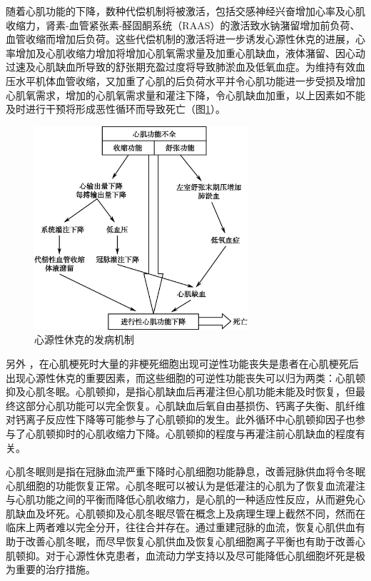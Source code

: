 随着心肌功能的下降，数种代偿机制将被激活，包括交感神经兴奋增加心率及心肌收缩力，肾素-血管紧张素-醛固酮系统（RAAS）的激活致水钠潴留增加前负荷、血管收缩而增加后负荷。这些代偿机制的激活将进一步诱发心源性休克的进展，心率增加及心肌收缩力增加将增加心肌氧需求量及加重心肌缺血，液体潴留、因心动过速及心肌缺血所导致的舒张期充盈过度将导致肺淤血及低氧血症。为维持有效血压水平机体血管收缩，又加重了心肌的后负荷水平并令心肌功能进一步受损及增加心肌氧需求，增加的心肌氧需求量和灌注下降，令心肌缺血加重，以上因素如不能及时进行干预将形成恶性循环而导致死亡（图\ref{fig21-1}）。

\begin{figure}[!htbp]
 \centering
 \includegraphics[width=3.11458in,height=2.96875in]{./images/Image00088.jpg}
 \captionsetup{justification=centering}
 \caption{心源性休克的发病机制}
 \label{fig21-1}
  \end{figure} 

另外
，在心肌梗死时大量的非梗死细胞出现可逆性功能丧失是患者在心肌梗死后出现心源性休克的重要因素，而这些细胞的可逆性功能丧失可以归为两类：心肌顿抑及心肌冬眠。心肌顿抑，是指心肌缺血后再灌注但心肌功能未能及时恢复，但最终这部分心肌功能可以完全恢复。心肌缺血后氧自由基损伤、钙离子失衡、肌纤维对钙离子反应性下降等可能参与了心肌顿抑的发生。此外循环中心肌顿抑因子也参与了心肌顿抑时的心肌收缩力下降。心肌顿抑的程度与再灌注前心肌缺血的程度有关。

心肌冬眠则是指在冠脉血流严重下降时心肌细胞功能静息，改善冠脉供血将令冬眠心肌细胞的功能恢复正常。心肌冬眠可以被认为是低灌注的心肌为了恢复血流灌注与心肌功能之间的平衡而降低心肌收缩力，是心肌的一种适应性反应，从而避免心肌缺血及坏死。心肌顿抑及心肌冬眠尽管在概念上及病理生理上截然不同，然而在临床上两者难以完全分开，往往合并存在。通过重建冠脉的血流，恢复心肌供血有助于改善心肌冬眠，而尽早恢复心肌供血及恢复心肌细胞离子平衡也有助于改善心肌顿抑。对于心源性休克患者，血流动力学支持以及尽可能降低心肌细胞坏死是极为重要的治疗措施。

